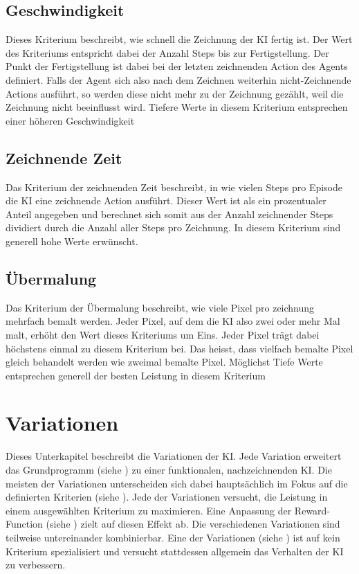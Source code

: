 \subsection{Geschwindigkeit}\label{sub:m_eval_speed} Dieses Kriterium
beschreibt, wie schnell die Zeichnung der KI fertig ist. Der Wert des Kriteriums
entspricht dabei der Anzahl Steps bis zur Fertigstellung. Der Punkt der
Fertigstellung ist dabei bei der letzten zeichnenden Action des Agents
definiert. Falls der Agent sich also nach dem Zeichnen weiterhin
nicht-Zeichnende Actions ausführt, so werden diese nicht mehr zu der Zeichnung
gezählt, weil die Zeichnung nicht beeinflusst wird. Tiefere Werte in diesem Kriterium entsprechen einer höheren Geschwindigkeit

\subsection{Zeichnende Zeit}\label{sub:m_eval_zeichnend} Das Kriterium der
zeichnenden Zeit beschreibt, in wie vielen Steps pro Episode die KI eine
zeichnende Action ausführt. Dieser Wert ist als ein prozentualer Anteil
angegeben und berechnet sich somit aus der Anzahl zeichnender Steps dividiert
durch die Anzahl aller Steps pro Zeichnung. In diesem Kriterium sind generell hohe Werte erwünscht.

\subsection{Übermalung}\label{sub:m_eval_uebermalung} Das Kriterium der
Übermalung beschreibt, wie viele Pixel pro zeichnung mehrfach bemalt werden.
Jeder Pixel, auf dem die KI also zwei oder mehr Mal malt, erhöht den Wert dieses
Kriteriums um Eins. Jeder Pixel trägt dabei höchstens einmal zu diesem Kriterium
bei. Das heisst, dass vielfach bemalte Pixel gleich behandelt werden wie zweimal
bemalte Pixel. Möglichst Tiefe Werte entsprechen generell der besten Leistung in
diesem Kriterium

\section{Variationen}\label{chap:m_var} Dieses Unterkapitel beschreibt die
Variationen der KI. Jede Variation erweitert das Grundprogramm (siehe
) zu einer funktionalen, nachzeichnenden KI. Die meisten
der Variationen unterscheiden sich dabei hauptsächlich im Fokus auf die
definierten Kriterien (siehe ). Jede der Variationen
versucht, die Leistung in einem ausgewählten Kriterium zu maximieren. Eine
Anpassung der Reward-Function (siehe ) zielt auf diesen
Effekt ab. Die verschiedenen Variationen sind teilweise untereinander
kombinierbar. Eine der Variationen (siehe ) ist auf
kein Kriterium spezialisiert und versucht stattdessen allgemein das Verhalten
der KI zu verbessern.
 
